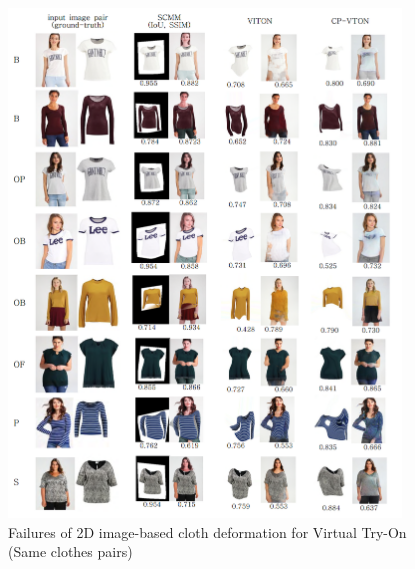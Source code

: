 \begin{figure}[t]
\centering
\includegraphics[height=13.5cm, scale=1]{figures/2dvton_same.png}   %
\caption{Failures of 2D image-based cloth deformation for Virtual Try-On (Same clothes pairs)}
\label{fig:classified2DVTONresult}
\end{figure}





